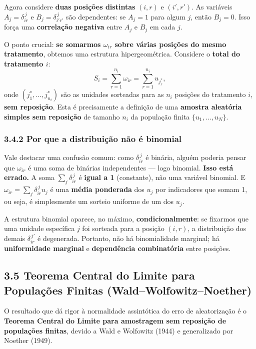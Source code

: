 \documentclass[
]{article}
\begin{document}
Agora considere \textbf{duas posições distintas} \((i,r)\) e
\((i',r')\). As variáveis \(A_j = \delta_{ir}^{\,j}\) e
\(B_j = \delta_{i'r'}^{\,j}\) são dependentes: se \(A_j = 1\) para algum
\(j\), então \(B_j = 0\). Isso força uma \textbf{correlação negativa}
entre \(A_j\) e \(B_j\) em cada \(j\).

O ponto crucial: \textbf{se somarmos \(\omega_{ir}\) sobre várias
posições do mesmo tratamento}, obtemos uma estrutura hipergeométrica.
Considere o \textbf{total do tratamento \(i\)}:
\[S_i = \sum_{r=1}^{n_i} \omega_{ir} = \sum_{r=1}^{n_i} u_{j_r^*},\]
onde \((j_1^*,\dots,j_{n_i}^*)\) são as unidades sorteadas para as
\(n_i\) posições do tratamento \(i\), \textbf{sem reposição}. Esta é
precisamente a definição de uma \textbf{amostra aleatória simples sem
reposição} de tamanho \(n_i\) da população finita \(\{u_1,\dots,u_N\}\).

\subsubsection{3.4.2 Por que a distribuição não é
binomial}\label{por-que-a-distribuiuxe7uxe3o-nuxe3o-uxe9-binomial}

Vale destacar uma confusão comum: como \(\delta_{ir}^{\,j}\) é binária,
alguém poderia pensar que \(\omega_{ir}\) é uma soma de binárias
independentes --- logo binomial. \textbf{Isso está errado.} A soma
\(\sum_j \delta_{ir}^{\,j}\) é \textbf{igual a 1} (constante), não uma
variável binomial. E \(\omega_{ir} = \sum_j \delta_{ir}^{\,j} u_j\) é
uma \textbf{média ponderada} dos \(u_j\) por indicadores que somam 1, ou
seja, é simplesmente um sorteio uniforme de um dos \(u_j\).

A estrutura binomial aparece, no máximo, \textbf{condicionalmente}: se
fixarmos que uma unidade específica \(j\) foi sorteada para a posição
\((i,r)\), a distribuição dos demais \(\delta_{ir}^{\,j'}\) é
degenerada. Portanto, não há binomialidade marginal; há
\textbf{uniformidade marginal} e \textbf{dependência combinatória} entre
posições.

\subsection{3.5 Teorema Central do Limite para Populações Finitas
(Wald--Wolfowitz--Noether)}\label{teorema-central-do-limite-para-populauxe7uxf5es-finitas-waldwolfowitznoether}

O resultado que dá rigor à normalidade assintótica do erro de
aleatorização é o \textbf{Teorema Central do Limite para amostragem sem
reposição de populações finitas}, devido a Wald e Wolfowitz (1944) e
generalizado por Noether (1949).
\end{document}
